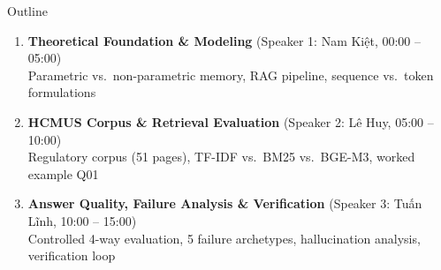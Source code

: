 \begin{frame}{Outline}
  \vspace{0.2cm}
  \begin{enumerate}
    \setlength{\itemsep}{0.45cm}
    \item {\large\textbf{Theoretical Foundation \& Modeling}} \hfill {\footnotesize\textcolor{gray!80!black}{(Speaker 1: Nam Kiệt, 00:00 -- 05:00)}}\\[2pt]
          {\footnotesize Parametric vs.\ non-parametric memory, RAG pipeline, sequence vs.\ token formulations}
    \item {\large\textbf{HCMUS Corpus \& Retrieval Evaluation}} \hfill {\footnotesize\textcolor{gray!80!black}{(Speaker 2: Lê Huy, 05:00 -- 10:00)}}\\[2pt]
          {\footnotesize Regulatory corpus (51 pages), TF-IDF vs.\ BM25 vs.\ BGE-M3, worked example Q01}
    \item {\large\textbf{Answer Quality, Failure Analysis \& Verification}} \hfill {\footnotesize\textcolor{gray!80!black}{(Speaker 3: Tuấn Lĩnh, 10:00 -- 15:00)}}\\[2pt]
          {\footnotesize Controlled 4-way evaluation, 5 failure archetypes, hallucination analysis, verification loop}
  \end{enumerate}

\end{frame}

